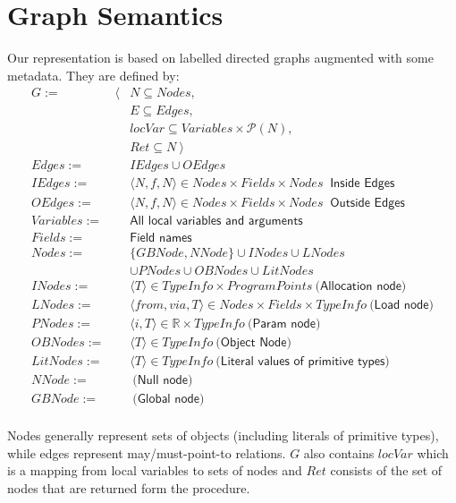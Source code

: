 \section{Graph Semantics}
Our representation is based on labelled directed graphs augmented with some
metadata. They are defined by:
\begin{eqnarray*}
    G           := &\langle& N \subseteq Nodes, \\
                   && E \subseteq Edges, \\
                   && locVar \subseteq Variables \times \mathcal{P}(N), \\
                   && Ret \subseteq N ~ \rangle \\
    Edges       := && IEdges \cup OEdges  \\
    IEdges      := && \langle N, f, N \rangle \in Nodes \times Fields \times Nodes ~\textsf{ Inside Edges } \\
    OEdges      := && \langle N, f, N \rangle \in Nodes \times Fields \times Nodes ~\textsf{ Outside Edges } \\
    Variables   := && \textsf{All local variables and arguments} \\
    Fields      := && \textsf{Field names} \\
    Nodes       := && \{ GBNode, NNode \} \cup INodes \cup LNodes \\
                   && \cup PNodes \cup OBNodes \cup LitNodes \\
    INodes      := && \langle T \rangle \in TypeInfo \times ProgramPoints ~ \textsf{(Allocation node)} \\
    LNodes      := && \langle from, via, T \rangle \in Nodes \times Fields \times TypeInfo ~ \textsf{(Load node)} \\
    PNodes      := && \langle i, T \rangle  \in \mathbb{R} \times TypeInfo ~ \textsf{(Param node)} \\
    OBNodes     := && \langle T \rangle \in TypeInfo ~ \textsf{(Object Node)} \\
    LitNodes    := && \langle T \rangle \in TypeInfo ~ \textsf{(Literal values of primitive types)} \\
    NNode       := && ~ \textsf{(Null node)} \\
    GBNode      := && ~ \textsf{(Global node)} \\
\end{eqnarray*}

Nodes generally represent sets of objects (including literals of primitive
types), while edges represent may/must-point-to relations. $G$ also contains
$locVar$ which is a mapping from local variables to sets of nodes and $Ret$
consists of the set of nodes that are returned form the procedure.


